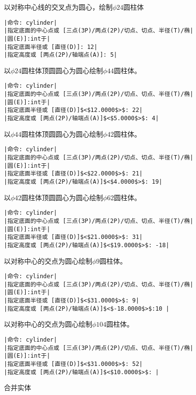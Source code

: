 \begin{procedure}
以对称中心线的交叉点为圆心，绘制$\phi 24$圆柱体
\begin{lstlisting}
|命令: cylinder|
|指定底面的中心点或 [三点(3P)/两点(2P)/切点、切点、半径(T)/椭|
|圆(E)]:int于|
|指定底面半径或 [直径(D)]: 12|
|指定高度或 [两点(2P)/轴端点(A)]: 5|
\end{lstlisting}
以$\phi 24$圆柱体顶圆圆心为圆心绘制$\phi 44$圆柱体。
\begin{lstlisting}
|命令: cylinder|
|指定底面的中心点或 [三点(3P)/两点(2P)/切点、切点、半径(T)/椭|
|圆(E)]:int于|
|指定底面半径或 [直径(D)]$<$12.0000$>$: 22|
|指定高度或 [两点(2P)/轴端点(A)]$<$5.0000$>$: 4|
\end{lstlisting}
以$\phi 44$圆柱体顶圆圆心为圆心绘制$\phi 42$圆柱体。
\begin{lstlisting}
|命令: cylinder|
|指定底面的中心点或 [三点(3P)/两点(2P)/切点、切点、半径(T)/椭|
|圆(E)]:int于|
|指定底面半径或 [直径(D)]$<$22.0000$>$: 21|
|指定高度或 [两点(2P)/轴端点(A)]$<$4.0000$>$: 19|
\end{lstlisting}
以$\phi 42$圆柱体顶圆圆心为圆心绘制$\phi 62$圆柱体。
\begin{lstlisting}
|命令: cylinder|
|指定底面的中心点或 [三点(3P)/两点(2P)/切点、切点、半径(T)/椭|
|圆(E)]:int于|
|指定底面半径或 [直径(D)]$<$21.0000$>$: 31|
|指定高度或 [两点(2P)/轴端点(A)]$<$19.0000$>$: -18|
\end{lstlisting}
以对称中心的交点为圆心绘制$\phi 9$圆柱体。
\begin{lstlisting}
|命令: cylinder|
|指定底面的中心点或 [三点(3P)/两点(2P)/切点、切点、半径(T)/椭|
|圆(E)]:int于|
|指定底面半径或 [直径(D)]$<$31.0000$>$: 9|
|指定高度或 [两点(2P)/轴端点(A)]$<$-18.0000$>$:10 |
\end{lstlisting}
以对称中心的交点为圆心绘制$\phi 104$圆柱体。
\begin{lstlisting}
|命令: cylinder|
|指定底面的中心点或 [三点(3P)/两点(2P)/切点、切点、半径(T)/椭|
|圆(E)]:int于|
|指定底面半径或 [直径(D)]$<$31.0000$>$: 52|
|指定高度或 [两点(2P)/轴端点(A)]$<$10.0000$>$: |
\end{lstlisting}
\item 合并实体


\end{procedure}

